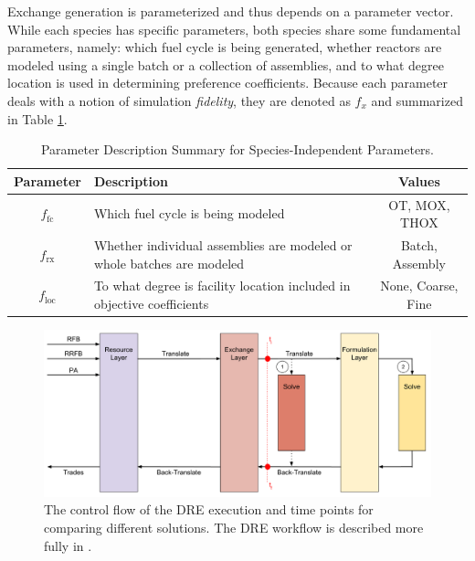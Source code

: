 \documentclass{anstrans}
\newcommand{\ffc}{$f_{\text{fc}}$}
\newcommand{\frx}{$f_{\text{rx}}$}
\newcommand{\floc}{$f_{\text{loc}}$}
\begin{document}
Exchange generation is parameterized and thus depends on a parameter
vector. While each species has specific parameters, both species share some
fundamental parameters, namely: which fuel cycle is being generated, whether
reactors are modeled using a single batch or a collection of assemblies, and to
what degree location is used in determining preference coefficients. Because
each parameter deals with a notion of simulation \textit{fidelity}, they are
denoted as $f_{x}$ and summarized in Table \ref{tbl:global_params}.

\begin{table}[]
\centering
\caption{Parameter Description Summary for Species-Independent Parameters.}
\label{tbl:global_params}
\begin{tabularx}{\columnwidth}{|c|X|c|} %
\hline
Parameter    & 
Description & 
Values
\\ \hline
\ffc      &
Which fuel cycle is being modeled &
OT, MOX, THOX
\\ \hline
\frx    &
Whether individual assemblies are modeled or whole batches are modeled &
Batch, Assembly  
\\ \hline
\floc     &
To what degree is facility location included in objective coefficients &
None, Coarse, Fine
\\ \hline
\end{tabularx}
\end{table}

\begin{figure}
  \begin{center}
    \includegraphics[width=2\columnwidth]{exchange_xlation_timing.pdf}
    \caption[]{
      \label{fig:dre_time}
      The control flow of the DRE execution and time points for comparing 
      different solutions. The DRE workflow is described more fully in 
      \cite{gidden_agent-based_2013, gidden_agent-based_2014}. }
  \end{center}
\end{figure}
\end{document}
